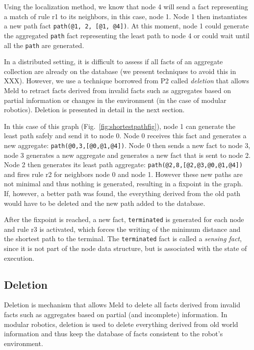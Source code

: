 \documentclass[preprint]{sigplanconf}
\begin{document}
Using the localization method, we know that node 4 will send a fact representing
a match of rule r1 to its neighbors, in this case, node 1. Node 1 then instantiates a new
path fact \texttt{path(@1,~2,~[@1, @4])}. At this moment, node 1 could generate the aggregated
\texttt{path} fact representing the least path to node 4 or could wait until all the \texttt{path}
are generated.

In a distributed setting, it is difficult to assess if all facts of an
aggregate collection are already on the database (we present techniques to avoid this in XXX).
However, we use a technique borrowed from P2 called \emph{deletion} that allows Meld
to retract facts derived from invalid facts such as aggregates based on partial information
or changes in the environment (in the case of modular robotics). Deletion
is presented in detail in the next section.

In this case of this graph (Fig.~\ref{fig:shortestpathfig}), node 1 can generate the least path
safely and send it to node 0. Node 0 receives this fact and generates a new aggregate: \texttt{path(@0,3,[@0,@1,@4])}. Node 0 then sends a new fact to node 3, node 3 generates a
new aggregate and generates a new fact that is sent to node 2. Node 2 then generates its
least path aggregate: \texttt{path(@2,8,[@2,@3,@0,@1,@4])} and fires rule r2 for neighbors
node 0 and node 1. However these new paths are not minimal and thus nothing is generated,
resulting in a fixpoint in the graph. If, however, a better path was found, the everything
derived from the old path would have to be deleted and the new path added to the database.

After the fixpoint is reached, a new fact, \texttt{terminated} is generated for each node
and rule r3 is activated, which forces the writing of the minimum distance and the shortest path
to the terminal. The \texttt{terminated} fact is called a \emph{sensing fact}, since it is not
part of the node data structure, but is associated with the state of execution. 

\subsection{Deletion}

Deletion is mechanism that allows Meld to delete all facts derived from invalid facts such
as aggregates based on partial (and incomplete) information. In modular robotics,
deletion is used to delete everything derived from old world information and thus keep the database
of facts consistent to the robot's environment.
\end{document}
